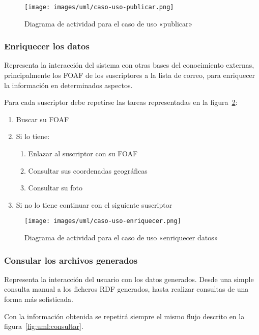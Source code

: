 \begin{figure}[H]
 	\centering
	\texttt{[image: images/uml/caso-uso-publicar.png]}
	\caption{Diagrama de actividad para el caso de uso «publicar»}
	\label{fig:uml:publicar}
\end{figure}

\subsubsection{Enriquecer los datos}

Representa la interacción del sistema con otras bases del conocimiento externas, 
principalmente los FOAF de los suscriptores a la lista de correo, para enriquecer 
la información en determinados aspectos.

Para cada suscriptor debe repetirse las tareas representadas en la 
figura~\ref{fig:uml:enriquecer}:

\begin{enumerate}
  \item Buscar su FOAF
  \item Si lo tiene:
	\begin{enumerate}
	  \item	Enlazar al suscriptor con su FOAF
	  \item Consultar sus coordenadas geográficas
	  \item Consultar su foto
	\end{enumerate}
  \item Si no lo tiene continuar con el siguiente suscriptor
\end{enumerate}

\begin{figure}[H]
 	\centering
	\texttt{[image: images/uml/caso-uso-enriquecer.png]}
	\caption{Diagrama de actividad para el caso de uso «enriquecer datos»}
	\label{fig:uml:enriquecer}
\end{figure}

\subsubsection{Consular los archivos generados}

Representa la interacción del usuario con los datos generados. Desde una 
simple consulta manual a los ficheros RDF generados, hasta realizar 
consultas de una forma más sofisticada.

Con la información obtenida se repetirá siempre el mismo flujo descrito en
la figura~\ref{fig:uml:consultar}.

